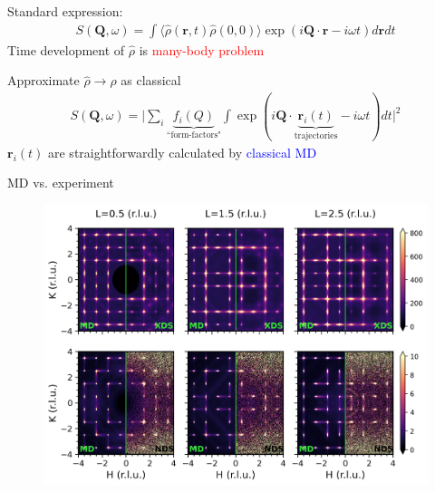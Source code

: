 \documentclass[12pt]{beamer}
\begin{document}
\begin{frame} %

Standard expression:
\begin{equation*}
\begin{gathered}
    S(\bm{Q},\omega) = \int \langle \hat{\rho}(\bm{r},t) \hat{\rho} (0,0) \rangle \exp(i\bm{Q}\cdot \bm{r} -i \omega t) d\bm{r} dt
\end{gathered}
\end{equation*}
Time development of $\hat{\rho}$ is \textcolor{red}{many-body problem} %

\vspace{1cm}
Approximate $\hat{\rho} \rightarrow \rho$ as classical
\begin{equation*}
\begin{gathered}
    S(\bm{Q},\omega) = \Big| \sum_i \underbrace{f_i(Q)}_\text{``form-factors"} \int \exp(i\bm{Q}\cdot \underbrace{\bm{r}_i(t)}_\text{trajectories} -i \omega t) dt \Big|^2
\end{gathered}
\end{equation*}
$\bm{r}_i(t)$ are straightforwardly calculated by \textcolor{blue}{classical MD} %

\end{frame}


\begin{frame}{MD vs. experiment}

\begin{figure}
    \includegraphics[width=1.0\linewidth]{figs/acns_md_vs_exp.png}
\end{figure}

\end{frame}
\end{document}
